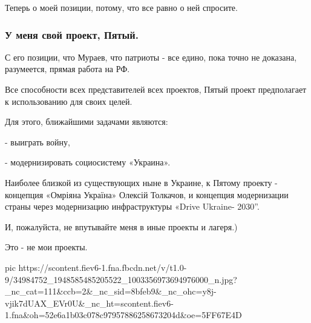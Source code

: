 Теперь о моей позиции, потому, что все равно о ней спросите.

\subsubsection{У меня свой проект, Пятый.}

С его позиции, что Мураев, что патриоты - все едино, пока точно не доказана,
разумеется, прямая работа на РФ.

Все способности всех представителей всех проектов, Пятый проект предполагает к
использованию для своих целей.

Для этого, ближайшими задачами являются:

- выиграть войну,

- модернизировать социосистему «Украина».

Наиболее близкой из существующих ныне в Украине, к Пятому проекту - концепция
«Омріяна Україна» Олексій Толкачов, и концепция модернизации страны через
модернизацию инфраструктуры «Drive Ukraine- 2030”.

И, пожалуйста, не впутывайте меня в иные проекты и лагеря.)

Это - не мои проекты.

\ifcmt
pic https://scontent.fiev6-1.fna.fbcdn.net/v/t1.0-9/34984752_1948585485205522_1003356973694976000_n.jpg?_nc_cat=111&ccb=2&_nc_sid=8bfeb9&_nc_ohc=y8j-vjik7dUAX_EVr0U&_nc_ht=scontent.fiev6-1.fna&oh=52e6a1b03c078c97957886258673204d&oe=5FF67E4D
\fi
